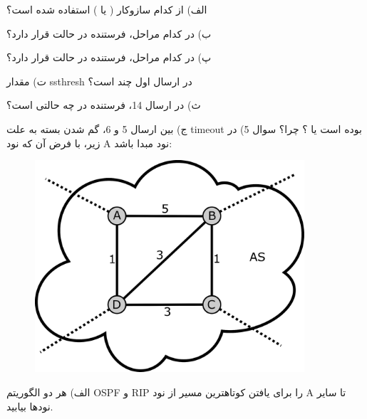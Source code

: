 \documentclass[10pt,letterpaper]{article}
\begin{document}
الف) از کدام سازوکار ( یا ) استفاده شده است؟

ب) در کدام مراحل، فرستنده در حالت  قرار دارد؟

پ) در کدام مراحل، فرستنده در حالت  قرار دارد؟

ت) مقدار ssthresh در ارسال اول چند است؟

ث) در ارسال 14، فرستنده در چه حالتی است؟

ج) بین ارسال 5 و 6، گم شدن بسته به علت timeout بوده است یا ؟ چرا؟
\newpage
سوال 5) در  زیر، با فرض آن که نود A نود مبدا باشد:
\begin{figure}[htb]
\centering
\includegraphics[width=100mm]{Q4.eps}
\end{figure}

الف) هر دو الگوریتم OSPF و RIP را برای یافتن کوتاهترین مسیر از نود A تا سایر نودها بیابید.
\end{document}
